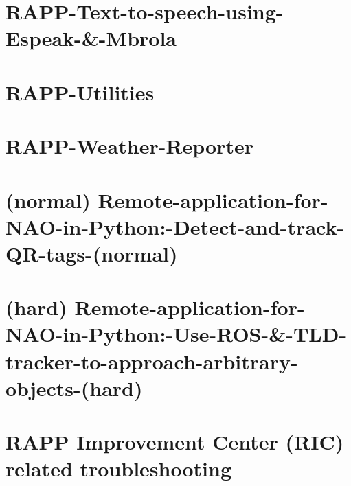 \documentclass[twoside]{book}
\begin{document}
\chapter{R\-A\-P\-P-\/\-Text-\/to-\/speech-\/using-\/\-Espeak-\/\&-\/\-Mbrola}
\label{md_rapp-platform_8wiki_RAPP-Text-to-speech-using-Espeak-_6-Mbrola}
\hypertarget{md_rapp-platform_8wiki_RAPP-Text-to-speech-using-Espeak-_6-Mbrola}{}

\chapter{R\-A\-P\-P-\/\-Utilities}
\label{md_rapp-platform_8wiki_RAPP-Utilities}
\hypertarget{md_rapp-platform_8wiki_RAPP-Utilities}{}

\chapter{R\-A\-P\-P-\/\-Weather-\/\-Reporter}
\label{md_rapp-platform_8wiki_RAPP-Weather-Reporter}
\hypertarget{md_rapp-platform_8wiki_RAPP-Weather-Reporter}{}

\chapter{(normal) Remote-\/application-\/for-\/\-N\-A\-O-\/in-\/\-Python\-:-\/\-Detect-\/and-\/track-\/\-Q\-R-\/tags-\/(normal)}
\label{md_rapp-platform_8wiki_Remote-application-for-NAO-in-Python_1-Detect-and-track-QR-tags-}
\hypertarget{md_rapp-platform_8wiki_Remote-application-for-NAO-in-Python_1-Detect-and-track-QR-tags-}{}

\chapter{(hard) Remote-\/application-\/for-\/\-N\-A\-O-\/in-\/\-Python\-:-\/\-Use-\/\-R\-O\-S-\/\&-\/\-T\-L\-D-\/tracker-\/to-\/approach-\/arbitrary-\/objects-\/(hard)}
\label{md_rapp-platform_8wiki_Remote-application-for-NAO-in-Python_1-Use-ROS-_6-TLD-tracker-to-approach-arbitrary-objects-}
\hypertarget{md_rapp-platform_8wiki_Remote-application-for-NAO-in-Python_1-Use-ROS-_6-TLD-tracker-to-approach-arbitrary-objects-}{}

\chapter{R\-A\-P\-P Improvement Center (R\-I\-C) related troubleshooting}
\label{md_rapp-platform_8wiki_Troubleshooting-RAPP-Improvement-Center}
\hypertarget{md_rapp-platform_8wiki_Troubleshooting-RAPP-Improvement-Center}{}

\end{document}
